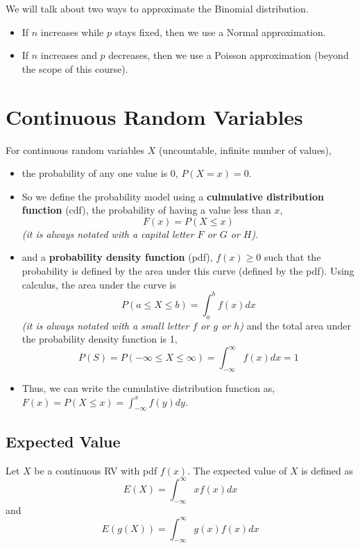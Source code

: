 \documentclass[
]{book}
\providecommand{\tightlist}{%
  \setlength{\itemsep}{0pt}\setlength{\parskip}{0pt}}
\begin{document}
We will talk about two ways to approximate the Binomial distribution.

\begin{itemize}
\tightlist
\item
  If \(n\) increases while \(p\) stays fixed, then we use a Normal approximation.
\item
  If \(n\) increases and \(p\) decreases, then we use a Poisson approximation (beyond the scope of this course).
\end{itemize}

\hypertarget{continuous-random-variables}{%
\section{Continuous Random Variables}\label{continuous-random-variables}}

For continuous random variables \(X\) (uncountable, infinite number of values),

\begin{itemize}
\item
  the probability of any one value is 0, \(P(X = x) = 0\).
\item
  So we define the probability model using a \textbf{culmulative distribution function} (cdf), the probability of having a value less than \(x\),
  \[F(x) = P(X\leq x)\]
  \emph{(it is always notated with a capital letter \(F\) or \(G\) or \(H\))}.
\item
  and a \textbf{probability density function} (pdf), \(f(x)\geq 0\) such that the probability is defined by the area under this curve (defined by the pdf). Using calculus, the area under the curve is
  \[P(a\leq X \leq b) = \int^b_a f(x)dx\]
  \emph{(it is always notated with a small letter \(f\) or \(g\) or \(h\))} and the total area under the probability density function is 1,
  \[P(S) = P(-\infty\leq X\leq \infty) = \int^\infty_{-\infty}f(x)dx = 1\]
\item
  Thus, we can write the cumulative distribution function as, \(F(x) = P(X \leq x) = \int^x_{-\infty} f(y)dy\).
\end{itemize}

\hypertarget{expected-value-1}{%
\subsection{Expected Value}\label{expected-value-1}}

Let \(X\) be a continuous RV with pdf \(f(x)\). The expected value of \(X\) is defined as
\[E(X)= \int^\infty_{-\infty} xf(x)dx \]
and
\[E(g(X))= \int^\infty_{-\infty} g(x)f(x)dx\]
\end{document}
